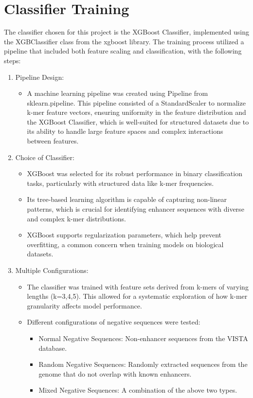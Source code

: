 \documentclass[11pt, a4paper, hidelinks]{article}
\begin{document}
\section{Classifier Training}\label{sec:classifier-training}

The classifier chosen for this project is the XGBoost Classifier, implemented using the XGBClassifier class from the xgboost library. The training process utilized a pipeline that included both feature scaling and classification, with the following steps:

\begin{enumerate}

    \item Pipeline Design:
    \begin{itemize}
    \item A machine learning pipeline was created using Pipeline from sklearn.pipeline. This pipeline consisted of a StandardScaler to normalize k-mer feature vectors, ensuring uniformity in the feature distribution and the XGBoost Classifier, which is well-suited for structured datasets due to its ability to handle large feature spaces and complex interactions between features.

    \end{itemize}
    \item Choice of Classifier:
    \begin{itemize}
        \item XGBoost was selected for its robust performance in binary classification tasks, particularly with structured data like k-mer frequencies.
        \item Its tree-based learning algorithm is capable of capturing non-linear patterns, which is crucial for identifying enhancer sequences with diverse and complex k-mer distributions.
        \item XGBoost supports regularization parameters, which help prevent overfitting, a common concern when training models on biological datasets.
    \end{itemize}
    
    \item Multiple Configurations:
    \begin{itemize}
        \item The classifier was trained with feature sets derived from k-mers of varying lengths (k=3,4,5). This allowed for a systematic exploration of how k-mer granularity affects model performance.
        \item Different configurations of negative sequences were tested:
        \begin{itemize}
            \item Normal Negative Sequences: Non-enhancer sequences from the VISTA database.
            \item Random Negative Sequences: Randomly extracted sequences from the genome that do not overlap with known enhancers.
            \item Mixed Negative Sequences: A combination of the above two types.
        \end{itemize}
    

\end{itemize}
\end{enumerate}
\end{document}
